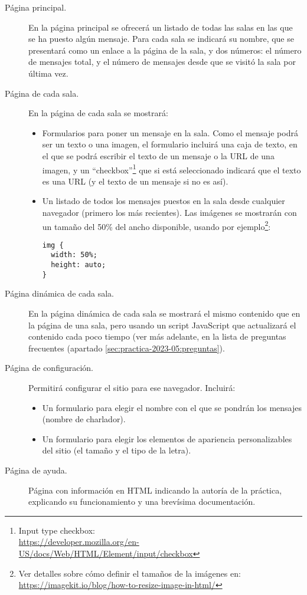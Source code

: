 \begin{description}
\item[Página principal.] En la página principal se ofrecerá un listado de todas las salas en las que se ha puesto algún mensaje. Para cada sala se indicará su nombre, que se presentará como un enlace a la página de la sala, y dos números: el número de mensajes total, y el número de mensajes desde que se visitó la sala por última vez.
\item[Página de cada sala.] En la página de cada sala se mostrará:
  \begin{itemize}
  \item Formularios para poner un mensaje en la sala. Como el mensaje podrá ser un texto o una imagen, el formulario incluirá una caja de texto, en el que se podrá escribir el texto de un mensaje o la URL de una imagen, y un ``checkbox''\footnote{Input type checkbox: \\ \url{https://developer.mozilla.org/en-US/docs/Web/HTML/Element/input/checkbox}} que si está seleccionado indicará que el texto es una URL (y el texto de un mensaje si no es así).
  \item Un listado de todos los mensajes puestos en la sala desde cualquier navegador (primero los más recientes). Las imágenes se mostrarán con un tamaño del 50\% del ancho disponible, usando por ejemplo\footnote{Ver detalles sobre cómo definir el tamaños de la imágenes en: \\ \url{https://imagekit.io/blog/how-to-resize-image-in-html/}}:

\begin{verbatim}
img {
  width: 50%;
  height: auto;
}
\end{verbatim}

  \end{itemize}

\item[Página dinámica de cada sala.] En la página dinámica de cada sala se mostrará el mismo contenido que en la página de una sala, pero usando un script JavaScript que actualizará el contenido cada poco tiempo (ver más adelante, en la lista de preguntas frecuentes (apartado \ref{sec:practica-2023-05:preguntas}).
  
\item[Página de configuración.] Permitirá configurar el sitio para ese navegador. Incluirá:
  \begin{itemize}
  \item Un formulario para elegir el nombre con el que se pondrán los mensajes (nombre de charlador).
  \item Un formulario para elegir los elementos de apariencia personalizables del sitio (el tamaño y el tipo de la letra).
  \end{itemize}
\item[Página de ayuda.] Página con información en HTML indicando la autoría de la práctica, explicando su funcionamiento y una brevísima documentación.
\end{description}

